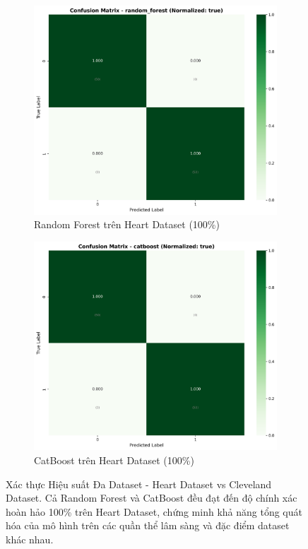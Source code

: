 \begin{figure}[H]
\centering
\begin{subfigure}[b]{0.48\textwidth}
\centering
\includegraphics[width=1\textwidth]{Result/heart_dataset/confusion_matrices/random_forest_numeric_dataset_StandardScaler.png}
\caption{Random Forest trên Heart Dataset (100\%)}
\label{fig:rf_heart_dataset}
\end{subfigure}
\hfill
\begin{subfigure}[b]{0.48\textwidth}
\centering
\includegraphics[width=1\textwidth]{Result/heart_dataset/confusion_matrices/catboost_numeric_dataset_StandardScaler.png}
\caption{CatBoost trên Heart Dataset (100\%)}
\label{fig:catboost_heart_dataset}
\end{subfigure}

\caption{Xác thực Hiệu suất Đa Dataset - Heart Dataset vs Cleveland Dataset. Cả Random Forest và CatBoost đều đạt đến độ chính xác hoàn hảo 100\% trên Heart Dataset, chứng minh khả năng tổng quát hóa của mô hình trên các quần thể lâm sàng và đặc điểm dataset khác nhau.}
\label{fig:heart_dataset_comparison}
\end{figure}


